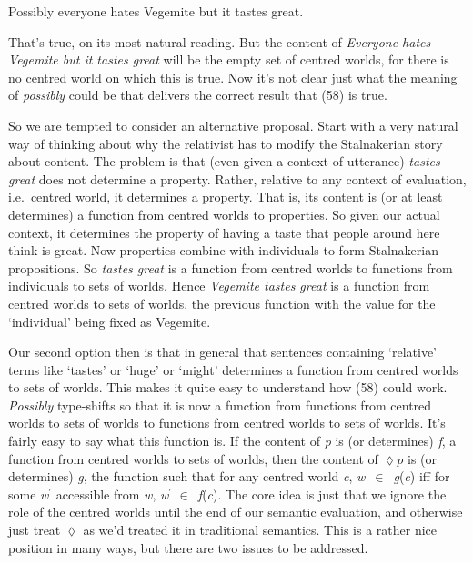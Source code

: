 \documentclass[
  11pt,
  letterpaper,
  DIV=11,
  numbers=noendperiod]{scrartcl}
\providecommand{\tightlist}{%
  \setlength{\itemsep}{0pt}\setlength{\parskip}{0pt}}\usepackage{longtable,booktabs,array}
\begin{document}
\begin{description}
\tightlist
\item[(58)]
Possibly everyone hates Vegemite but it tastes great.
\end{description}

That's true, on its most natural reading. But the content of
\emph{Everyone hates Vegemite but it tastes great} will be the empty set
of centred worlds, for there is no centred world on which this is true.
Now it's not clear just what the meaning of \emph{possibly} could be
that delivers the correct result that (58) is true.

So we are tempted to consider an alternative proposal. Start with a very
natural way of thinking about why the relativist has to modify the
Stalnakerian story about content. The problem is that (even given a
context of utterance) \emph{tastes great} does not determine a property.
Rather, relative to any context of evaluation, i.e.~centred world, it
determines a property. That is, its content is (or at least determines)
a function from centred worlds to properties. So given our actual
context, it determines the property of having a taste that people around
here think is great. Now properties combine with individuals to form
Stalnakerian propositions. So \emph{tastes great} is a function from
centred worlds to functions from individuals to sets of worlds. Hence
\emph{Vegemite tastes great} is a function from centred worlds to sets
of worlds, the previous function with the value for the `individual'
being fixed as Vegemite.

Our second option then is that in general that sentences containing
`relative' terms like `tastes' or `huge' or `might' determines a
function from centred worlds to sets of worlds. This makes it quite easy
to understand how (58) could work. \emph{Possibly} type-shifts so that
it is now a function from functions from centred worlds to sets of
worlds to functions from centred worlds to sets of worlds. It's fairly
easy to say what this function is. If the content of \emph{p} is (or
determines) \emph{f}, a function from centred worlds to sets of worlds,
then the content of \(\lozenge p\) is (or determines) \emph{g}, the
function such that for any centred world \emph{c},
\emph{w}~\({\in}\)~\emph{g}(\emph{c}) iff for some \emph{w}\(^\prime\)
accessible from \emph{w}, \emph{w}\(^\prime\)
\({\in}\)~\emph{f}(\emph{c}). The core idea is just that we ignore the
role of the centred worlds until the end of our semantic evaluation, and
otherwise just treat \(\lozenge\) as we'd treated it in traditional
semantics. This is a rather nice position in many ways, but there are
two issues to be addressed.
\end{document}
